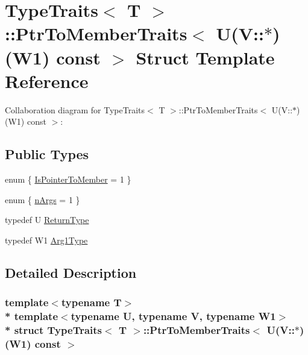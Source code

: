 \hypertarget{structTypeTraits_1_1PtrToMemberTraits_3_01U_07V_1_1_5_08_07W1_08_01const_01_01_4}{}\section{Type\+Traits$<$ T $>$\+:\+:Ptr\+To\+Member\+Traits$<$ U(V\+:\+:$\ast$)(W1) const $>$ Struct Template Reference}
\label{structTypeTraits_1_1PtrToMemberTraits_3_01U_07V_1_1_5_08_07W1_08_01const_01_01_4}


Collaboration diagram for Type\+Traits$<$ T $>$\+:\+:Ptr\+To\+Member\+Traits$<$ U(V\+:\+:$\ast$)(W1) const $>$\+:
\subsection*{Public Types}
\begin{DoxyCompactItemize}
\item 
enum \{ \hyperlink{structTypeTraits_1_1PtrToMemberTraits_3_01U_07V_1_1_5_08_07W1_08_01const_01_01_4_aa3332f934f2ded410d9991ad51a3d49aa49aab7ee7206b7fe38d98b2e4810279d}{Is\+Pointer\+To\+Member} = 1
 \}
\item 
enum \{ \hyperlink{structTypeTraits_1_1PtrToMemberTraits_3_01U_07V_1_1_5_08_07W1_08_01const_01_01_4_aabfa84aba11641ee5ef6d4d1392f298da08e8ca286437c0039fdf0b0a5bf06482}{n\+Args} = 1
 \}
\item 
typedef U \hyperlink{structTypeTraits_1_1PtrToMemberTraits_3_01U_07V_1_1_5_08_07W1_08_01const_01_01_4_a7a3bdb38504bb3775a00d41ebcc2644d}{Return\+Type}
\item 
typedef W1 \hyperlink{structTypeTraits_1_1PtrToMemberTraits_3_01U_07V_1_1_5_08_07W1_08_01const_01_01_4_a2f29e44d0bfe78e4391e1983f600bdcb}{Arg1\+Type}
\end{DoxyCompactItemize}


\subsection{Detailed Description}
\subsubsection*{template$<$typename T$>$\\*
template$<$typename U, typename V, typename W1$>$\\*
struct Type\+Traits$<$ T $>$\+::\+Ptr\+To\+Member\+Traits$<$ U(\+V\+::$\ast$)(\+W1) const  $>$}

